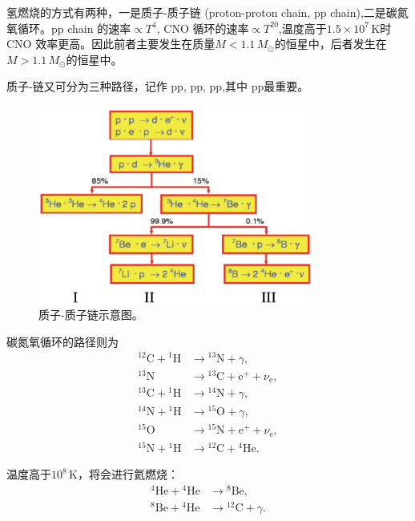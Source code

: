 \documentclass[../天体物理基础.tex]{subfiles}
\begin{document}
氢燃烧的方式有两种，一是质子{}-{}质子链 (proton-proton chain, pp chain),二是碳氮氧循环。pp chain 的速率$\propto T^{4}$, CNO 循环的速率$\propto{}T^{20}$,温度高于$1.5\times10^{7}\,\mathrm{K}$时 CNO 效率更高。因此前者主要发生在质量$M<1.1\,M_{\odot}$的恒星中，后者发生在$M>1.1\,M_{\odot}$的恒星中。

质子{}-{}链又可分为三种路径，记作 pp\uppercase\expandafter{}, pp\uppercase\expandafter{}, pp\uppercase\expandafter{},其中 pp\uppercase\expandafter{}最重要。
\begin{figure}[!htbp]
\centering
\includegraphics[width=9cm]{figures/figure2_1.png}
\captionsetup{justification=raggedright, singlelinecheck=false}
\caption{质子{}-{}质子链示意图。}
\label{ppchain}
\end{figure}

碳氮氧循环的路径则为
\begin{align*}
{}^{12}\mathrm{C}+{}^{1}\mathrm{H}&\to{}^{13}\mathrm{N}+\gamma,\\
{}^{13}\mathrm{N}&\to{}^{13}\mathrm{C}+\mathrm{e}^{+}+\nu_{\mathrm{e}},\\
{}^{13}\mathrm{C}+{}^{1}\mathrm{H}&\to{}^{14}\mathrm{N}+\gamma,\\
{}^{14}\mathrm{N}+{}^{1}\mathrm{H}&\to{}^{15}\mathrm{O}+\gamma,\\
{}^{15}\mathrm{O}&\to{}^{15}\mathrm{N}+\mathrm{e}^{+}+\nu_{\mathrm{e}},\\
{}^{15}\mathrm{N}+{}^{1}\mathrm{H}&\to{}^{12}\mathrm{C}+{}^{4}\mathrm{He}.
\end{align*}

温度高于$10^{8}\,\mathrm{K}$，将会进行氦燃烧：
\begin{align*}
{}^{4}\mathrm{He}+{}^{4}\mathrm{He}&\to{}^{8}\mathrm{Be},\\
{}^{8}\mathrm{Be}+{}^{4}\mathrm{He}&\to{}^{12}\mathrm{C}+\gamma.
\end{align*}
\end{document}
